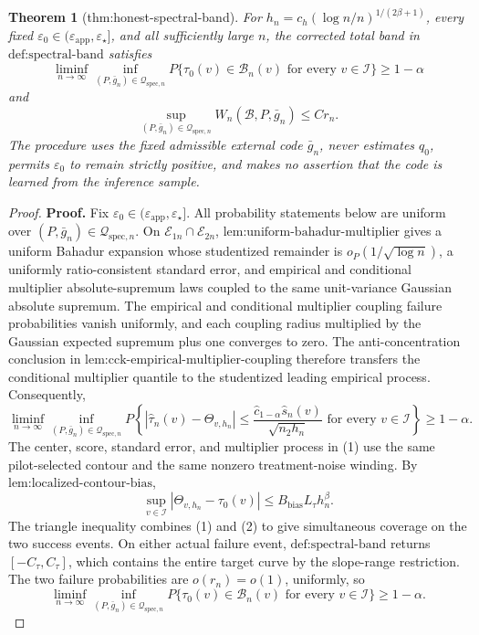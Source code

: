 \documentclass{article}
\newtheorem{theorem}{Theorem}
\begin{document}
\begin{theorem}[thm:honest-spectral-band]\label{thm:honest-spectral-band}
For \(h_n=c_h(\log n/n)^{1/(2\beta+1)}\), every fixed \(\varepsilon_0\in(\varepsilon_{\mathrm{app}},\varepsilon_\star]\), and all sufficiently large \(n\), the corrected total band in \(\text{def:spectral-band}\) satisfies
\[
 \liminf_{n\to\infty}\inf_{(P,\bar g_n)\in\mathcal Q_{\mathrm{spec},n}}P\{\tau_0(v)\in\mathcal B_n(v)\text{ for every }v\in\mathcal I\}\ge1-\alpha
\]
and
\[
 \sup_{(P,\bar g_n)\in\mathcal Q_{\mathrm{spec},n}}W_n(\mathcal B,P,\bar g_n)\le Cr_n.
\]
The procedure uses the fixed admissible external code \(\bar g_n\), never estimates \(q_0\), permits \(\varepsilon_0\) to remain strictly positive, and makes no assertion that the code is learned from the inference sample.
\end{theorem}
\begin{proof}
\textbf{Proof.}
Fix \(\varepsilon_0\in(\varepsilon_{\mathrm{app}},\varepsilon_\star]\).  All probability statements below are uniform over \((P,\bar g_n)\in\mathcal Q_{\mathrm{spec},n}\).  On \(\mathcal E_{1n}\cap\mathcal E_{2n}\), \(\text{lem:uniform-bahadur-multiplier}\) gives a uniform Bahadur expansion whose studentized remainder is \(o_P(1/\sqrt{\log n})\), a uniformly ratio-consistent standard error, and empirical and conditional multiplier absolute-supremum laws coupled to the same unit-variance Gaussian absolute supremum.  The empirical and conditional multiplier coupling failure probabilities vanish uniformly, and each coupling radius multiplied by the Gaussian expected supremum plus one converges to zero.  The anti-concentration conclusion in \(\text{lem:cck-empirical-multiplier-coupling}\) therefore transfers the conditional multiplier quantile to the studentized leading empirical process.  Consequently,
\[
 \liminf_{n\to\infty}\inf_{(P,\bar g_n)\in\mathcal Q_{\mathrm{spec},n}}
 P\left\{
 |\widehat\tau_n(v)-\Theta_{v,h_n}|
 \le\frac{\widehat c_{1-\alpha}\widehat s_n(v)}{\sqrt{n_2h_n}}
 \text{ for every }v\in\mathcal I
 \right\}\ge1-\alpha. \tag{1}
\]
The center, score, standard error, and multiplier process in (1) use the same pilot-selected contour and the same nonzero treatment-noise winding.  By \(\text{lem:localized-contour-bias}\),
\[
 \sup_{v\in\mathcal I}|\Theta_{v,h_n}-\tau_0(v)|
 \le B_{\mathrm{bias}}L_\tau h_n^\beta. \tag{2}
\]
The triangle inequality combines (1) and (2) to give simultaneous coverage on the two success events.  On either actual failure event, \(\text{def:spectral-band}\) returns \([-C_\tau,C_\tau]\), which contains the entire target curve by the slope-range restriction.  The two failure probabilities are \(o(r_n)=o(1)\), uniformly, so
\[
 \liminf_{n\to\infty}\inf_{(P,\bar g_n)\in\mathcal Q_{\mathrm{spec},n}}
 P\{\tau_0(v)\in\mathcal B_n(v)\text{ for every }v\in\mathcal I\}
 \ge1-\alpha. \tag{3}
\]


\end{proof}
\end{document}
